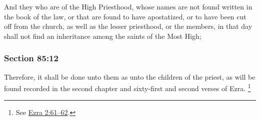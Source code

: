 		And they who are of the High Priesthood, whose names are not found written in the book of the law, or that are found to have apostatized, or to have been cut off from the church, as well as the lesser priesthood, or the members, in that day shall not find an inheritance among the saints of the Most High;


	\subsubsection{Section 85:12} %
		\label{DC85-12}

		Therefore, it shall be done unto them as unto the children of the priest, as will be found recorded in the second chapter and sixty-first and second verses of Ezra.%
			\footnote{%
				See \hyperref[EZRA-2-61]{Ezra 2:61--62}.
				}

